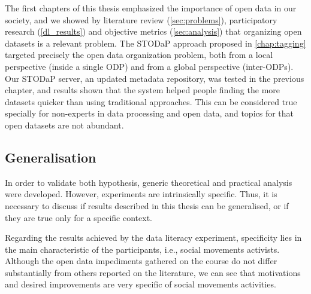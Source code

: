
The first chapters of this thesis emphasized the importance of open data in our society, and we showed by literature review (\autoref{sec:problems}), participatory research (\autoref{dl_results}) and objective metrics (\autoref{sec:analysis}) that organizing open datasets is a relevant problem.
The STODaP approach proposed in \autoref{chap:tagging} targeted precisely the open data organization problem, both from a local perspective (inside a single ODP) and from a global perspective (inter-ODPs).
Our STODaP server, an updated metadata repository, was tested in the previous chapter, and results shown that the system helped people finding the more datasets quicker than using traditional approaches.
This can be considered true specially for non-experts in data processing and open data, and topics for that open datasets are not abundant.

\subsection{Generalisation}

In order to validate both hypothesis, generic theoretical and practical analysis were developed.
However, experiments are intrinsically specific.
Thus, it is necessary to discuss if results described in this thesis can be generalised, or if they are true only for a specific context.

Regarding the results achieved by the data literacy experiment, specificity lies in the main characteristic of the participants, i.e., social movements activists.
Although the open data impediments gathered on the course do not differ substantially from others reported on the literature, we can see that motivations and desired improvements are very specific of social movements activities.

